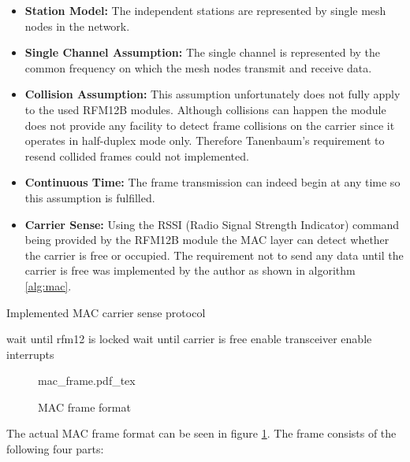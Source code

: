 \begin{itemize}
    \item \textbf{Station Model:} The independent stations are represented by single mesh nodes in the network.
    \item \textbf{Single Channel Assumption:} The single channel is represented by the common frequency on which the mesh nodes transmit and receive data.
    \item \textbf{Collision Assumption:} This assumption unfortunately does not fully apply to the used RFM12B modules. Although collisions can happen the module does not provide any facility to detect frame collisions on the carrier since it operates in half-duplex mode only. Therefore Tanenbaum's requirement to resend collided frames could not implemented.
    \item \textbf{Continuous Time:} The frame transmission can indeed begin at any time so this assumption is fulfilled.
    \item \textbf{Carrier Sense:} Using the RSSI (Radio Signal Strength Indicator) command being provided by the RFM12B module the MAC layer can detect whether the carrier is free or occupied. The requirement not to send any data until the carrier is free was implemented by the author as shown in algorithm \ref{alg:mac}.
\end{itemize}

\begin{algorithm}[H]
\caption{Implemented MAC carrier sense protocol}
\label{alg:mac}
\begin{algorithmic}
\STATE wait until rfm12 is locked
    \STATE wait until carrier is free
\ENDIF
\STATE enable transceiver
\STATE enable interrupts
\end{algorithmic}
\end{algorithm}

\begin{figure}[H]
    \centering
    {mac_frame.pdf_tex}
    \caption{MAC frame format}
    \label{fig:mac}
\end{figure}

The actual MAC frame format can be seen in figure \ref{fig:mac}. The frame consists of the following four parts:

